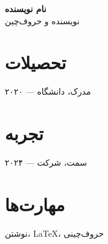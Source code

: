 \documentclass[11pt]{article}
\begin{document}
{\Large\bfseries نام نویسنده}\\[4pt]
{\large نویسنده و حروف‌چین}

\vspace{8pt}

\section*{تحصیلات}
۲۰۲۰ — مدرک، دانشگاه

\section*{تجربه}
۲۰۲۴ — سمت، شرکت

\section*{مهارت‌ها}
نوشتن، LaTeX، حروف‌چینی
\end{document}

